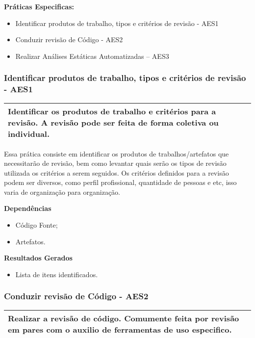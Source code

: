 \textbf{Práticas Especificas:}
\begin{itemize}
    \item Identificar produtos de trabalho, tipos e critérios de revisão - AES1
    \item Conduzir revisão de Código - AES2
    \item Realizar Análises Estáticas Automatizadas – AES3
\end{itemize}

\subsubsection{Identificar produtos de trabalho, tipos e critérios de revisão - AES1}
\label{sec:aes1}

\begin{table}[!ht]
\centering
\begin{tabular}{|p{130mm}|}
\hline
Identificar os produtos de trabalho e critérios para a revisão. A revisão pode ser feita de forma coletiva ou individual. \\ 
\hline
\end{tabular}
\end{table}

Essa prática consiste em identificar os produtos de trabalhos/artefatos que necessitarão de revisão, bem como levantar quais serão os tipos de revisão utilizada os critérios a serem seguidos. Os critérios definidos para a revisão podem ser diversos, como perfil profissional, quantidade de pessoas e etc, isso varia de organização para organização.

\textbf{Dependências}
\begin{itemize}
    \item Código Fonte;
    \item Artefatos.
\end{itemize}


\textbf{Resultados Gerados}
\begin{itemize}
    \item Lista de itens identificados.
\end{itemize}

\subsubsection{Conduzir revisão de Código - AES2}
\label{sec:aes2}

\begin{table}[!ht]
\centering
\begin{tabular}{|p{130mm}|}
\hline
Realizar a revisão de código. Comumente feita por revisão em pares com o auxilio de ferramentas de uso especifico. \\
\hline
\end{tabular}
\end{table}


